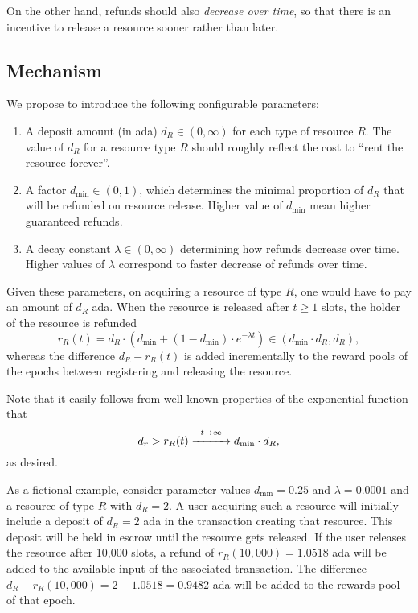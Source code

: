 \documentclass[11pt,a4paper]{article}
\begin{document}
On the other hand, refunds should also \emph{decrease over time}, so that
there is an incentive to release a resource sooner rather than later.

\subsection{Mechanism}

We propose to introduce the following configurable parameters:
\begin{enumerate}
    \item
        A deposit amount (in ada) $d_R\in(0,\infty)$ for each type of resource
        $R$. The value of $d_R$ for a resource type $R$ should roughly reflect
        the cost to ``rent the resource forever''.
    \item
        A factor $d_{\min}\in(0,1)$, which determines the minimal proportion of
        $d_R$ that will be refunded on resource release. Higher value of
        $d_{\min}$ mean higher guaranteed refunds.
    \item
        A decay constant $\lambda\in(0,\infty)$ determining how refunds decrease
        over time. Higher values of $\lambda$ correspond to faster decrease of
        refunds over time.
\end{enumerate}

Given these parameters, on acquiring a resource of type $R$, one would have to
pay an amount of $d_R$ ada\@. When the resource is released after $t\geq 1$ slots,
the holder of the resource is refunded
\[
    r_R(t)=d_R\cdot\left(d_{\min}+(1-d_{\min})\cdot e^{-\lambda t}\right)\in(d_{\min}\cdot d_R,d_R),
\]
whereas the difference $d_R-r_R(t)$ is added incrementally to the reward pools of
the epochs between registering and releasing the resource.

Note that it easily follows from well-known properties of the exponential
function that
\[
    d_r>r_R(t)\stackrel{t\rightarrow\infty}{\xrightarrow{\hspace{10mm}}}d_{\min}\cdot d_R,
\]
as desired.

As a fictional example, consider parameter values $d_{\min}=0.25$ and $\lambda=0.0001$
and a resource of type $R$ with $d_R=2$. A user acquiring such a resource
will initially include a deposit of $d_R=2$ ada in the transaction creating that
resource. This deposit will be held in escrow until the resource gets released.
If the user releases the resource after 10,000 slots, a refund of
$r_R(10,000)=1.0518$ ada will be added to the available input of the associated
transaction. The difference $d_R-r_R(10,000)=2-1.0518=0.9482$ ada will be added
to the rewards pool of that epoch.
\end{document}
